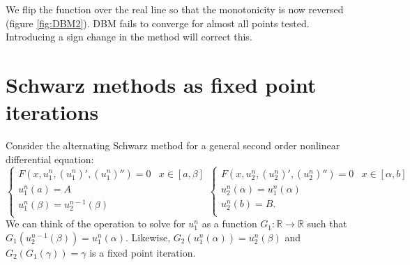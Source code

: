 \documentclass{book}
\begin{document}
We flip the function over the real line so that the monotonicity is now reversed (figure \ref{fig:DBM2}).
DBM fails to converge for almost all points tested.
Introducing a sign change in the method will correct this.

\chapter{Schwarz methods as fixed point iterations}

Consider the alternating Schwarz method for a general second order nonlinear differential equation:
\begin{equation} \label{eq:AS}
\begin{cases} F(x,u_1^n,(u_1^n)',(u_1^n)'') = 0 & x \in [a,\beta] \\
u^n_1(a) = A \\
u^n_1(\beta) = u_2^{n-1}(\beta) \\
\end{cases}
\begin{cases} F(x,u^n_2,(u^n_2)',(u^n_2)'') = 0 & x \in [\alpha,b] \\
u^n_2(\alpha) = u^n_1(\alpha) \\
u^n_2(b) = B . \\
\end{cases}
\end{equation}
%
We can think of the operation to solve for $u_1^n$ as a function $G_1: \mathbb{R} \rightarrow \mathbb{R}$ such that $G_1(u_2^{n-1}(\beta)) = u_1^n(\alpha)$.
Likewise, $G_2(u_1^n(\alpha)) = u_2^n(\beta)$ and $G_2(G_1(\gamma)) = \gamma$ is a fixed point iteration.
\end{document}
